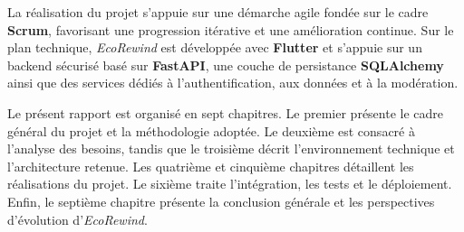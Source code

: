 La réalisation du projet s'appuie sur une démarche agile fondée sur le cadre \textbf{Scrum}, favorisant une progression itérative et une amélioration continue. Sur le plan technique, \textit{EcoRewind} est développée avec \textbf{Flutter} et s'appuie sur un backend sécurisé basé sur \textbf{FastAPI}, une couche de persistance \textbf{SQLAlchemy} ainsi que des services dédiés à l'authentification, aux données et à la modération.

Le présent rapport est organisé en sept chapitres. Le premier présente le cadre général du projet et la méthodologie adoptée. Le deuxième est consacré à l'analyse des besoins, tandis que le troisième décrit l'environnement technique et l'architecture retenue. Les quatrième et cinquième chapitres détaillent les réalisations du projet. Le sixième traite l'intégration, les tests et le déploiement. Enfin, le septième chapitre présente la conclusion générale et les perspectives d'évolution d'\textit{EcoRewind}.

